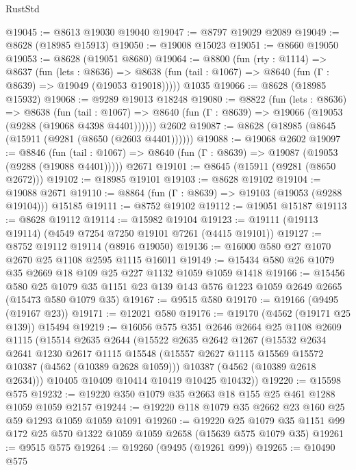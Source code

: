 \begin{lexlean}{RustStd}
\begin{coremodule}
@19045 := @8613 @19030 @19040
@19047 := @8797 @19029 @2089
@19049 := @8628 (@18985 @15913)
@19050 := @19008 @15023
@19051 := @8660 @19050
@19053 := @8628 (@19051 @8680)
@19064 := @8800
    (fun (rty : @1114) =>
    @8637
      (fun (lets : @8636) =>
      @8638 (fun (tail : @1067) => @8640 (fun (Γ : @8639) => @19049 (@19053 @19018)))))
    @1035
@19066 := @8628 (@18985 @15932)
@19068 := @9289 @19013 @18248
@19080 := @8822
    (fun (lets : @8636) =>
    @8638
      (fun (tail : @1067) =>
      @8640 (fun (Γ : @8639) => @19066 (@19053 (@9288 (@19068 @4398 @4401))))))
    @2602
@19087 := @8628 (@18985 (@8645 (@15911 (@9281 (@8650 (@2603 @4401))))))
@19088 := @19068 @2602
@19097 := @8846
    (fun (tail : @1067) => @8640 (fun (Γ : @8639) => @19087 (@19053 (@9288 (@19088 @4401)))))
    @2671
@19101 := @8645 (@15911 (@9281 (@8650 @2672)))
@19102 := @18985 @19101
@19103 := @8628 @19102
@19104 := @19088 @2671
@19110 := @8864 (fun (Γ : @8639) => @19103 (@19053 (@9288 @19104))) @15185
@19111 := @8752 @19102
@19112 := @19051 @15187
@19113 := @8628 @19112
@19114 := @15982 @19104
@19123 := @19111 (@19113 @19114) (@4549 @7254 @7250 @19101 @7261 (@4415 @19101))
@19127 := @8752 @19112 @19114 (@8916 @19050)
@19136 := @16000 @580 @27 @1070 @2670 @25 @1108 @2595 @1115 @16011
@19149 := @15434 @580 @26 @1079 @35 @2669 @18 @109 @25 @227 @1132 @1059 @1059 @1418
@19166 := @15456
    @580
    @25
    @1079
    @35
    @1151
    @23
    @139
    @143
    @576
    @1223
    @1059
    @2649
    @2665
    (@15473 @580 @1079 @35)
@19167 := @9515 @580
@19170 := @19166 (@9495 (@19167 @23))
@19171 := @12021 @580
@19176 := @19170 (@4562 (@19171 @25 @139)) @15494
@19219 := @16056
    @575
    @351
    @2646
    @2664
    @25
    @1108
    @2609
    @1115
    (@15514
      @2635
      @2644
      (@15522
        @2635
        @2642
        @1267
        (@15532
          @2634
          @2641
          @1230
          @2617
          @1115
          @15548
          (@15557 @2627 @1115 @15569 @15572 @10387 (@4562 (@10389 @2628 @1059)))
          @10387
          (@4562 (@10389 @2618 @2634)))
        @10405
        @10409
        @10414
        @10419
        @10425
        @10432))
@19220 := @15598 @575
@19232 := @19220 @350 @1079 @35 @2663 @18 @155 @25 @461 @1288 @1059 @1059 @2157
@19244 := @19220 @118 @1079 @35 @2662 @23 @160 @25 @59 @1293 @1059 @1059 @1091
@19260 := @19220
    @25
    @1079
    @35
    @1151
    @99
    @172
    @25
    @570
    @1322
    @1059
    @1059
    @2658
    (@15639 @575 @1079 @35)
@19261 := @9515 @575
@19264 := @19260 (@9495 (@19261 @99))
@19265 := @10490 @575

\end{coremodule}
\end{lexlean}
